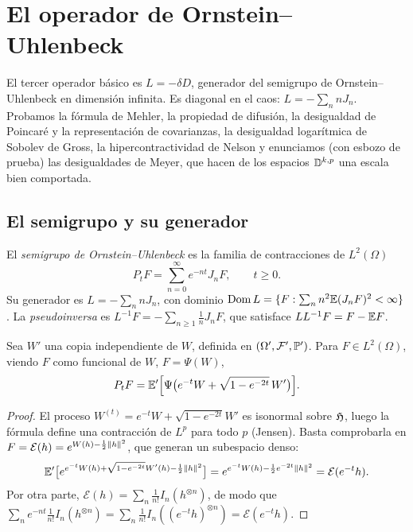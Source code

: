 \chapter{El operador de Ornstein--Uhlenbeck}\label{cap:ou}

\begin{panorama}
El tercer operador básico es $L=-\delta D$, generador del semigrupo de Ornstein--Uhlenbeck
en dimensión infinita. Es diagonal en el caos: $L=-\sum_nnJ_n$. Probamos la fórmula
de Mehler, la propiedad de difusión, la desigualdad de Poincaré y la representación de
covarianzas, la desigualdad logarítmica de Sobolev de Gross, la hipercontractividad de
Nelson y enunciamos (con esbozo de prueba) las desigualdades de Meyer, que hacen de
los espacios $\mathbb{D}^{k,p}$ una escala bien comportada.
\end{panorama}

\section{El semigrupo y su generador}

\begin{definicion}
El \emph{semigrupo de Ornstein--Uhlenbeck} es la familia de contracciones de $L^2(\Omega)$
\[
  P_tF=\sum_{n=0}^\infty e^{-nt}J_nF,\qquad t\ge0.
\]
Su generador es $L=-\sum_nnJ_n$, con dominio $\operatorname{Dom} L=\{F:\sum_nn^2\mathbb{E}(J_nF)^2<\infty\}$. La
\emph{pseudoinversa} es $L^{-1}F=-\sum_{n\ge1}\frac1nJ_nF$, que satisface $LL^{-1}F=F-\mathbb{E} F$.
\end{definicion}

\begin{teorema}\label{teo:mehler}
Sea $W'$ una copia independiente de $W$, definida en
$(\Omega',\mathcal{F}',\mathbb{P}')$. Para $F\in L^2(\Omega)$, viendo $F$ como funcional de $W$, $F=\Psi(W)$,
\[
  P_tF=\mathbb{E}'\Big[\Psi\big(e^{-t}W+\sqrt{1-e^{-2t}}\,W'\big)\Big].
\]
\end{teorema}

\begin{proof}
El proceso $W^{(t)}=e^{-t}W+\sqrt{1-e^{-2t}}W'$ es isonormal sobre $\mathfrak{H}$, luego la fórmula
define una contracción de $L^p$ para todo $p$ (Jensen). Basta comprobarla en $F=\mathcal E(h)=
e^{W(h)-\frac12\left\lVert h\right\rVert^2}$, que generan un subespacio denso:
\[
  \mathbb{E}'\big[e^{e^{-t}W(h)+\sqrt{1-e^{-2t}}W'(h)-\frac12\left\lVert h\right\rVert^2}\big]=e^{e^{-t}W(h)-\frac12e^{-2t}\left\lVert h\right\rVert^2}=\mathcal E(e^{-t}h).
\]
Por otra parte, $\mathcal E(h)=\sum_n\frac1{n!}I_n(h^{\otimes n})$, de modo que $\sum_ne^{-nt}\frac1{n!}I_n(h^{\otimes n})=\sum_n\frac1{n!}I_n((e^{-t}h)^{\otimes n})=
\mathcal E(e^{-t}h)$.
\end{proof}

